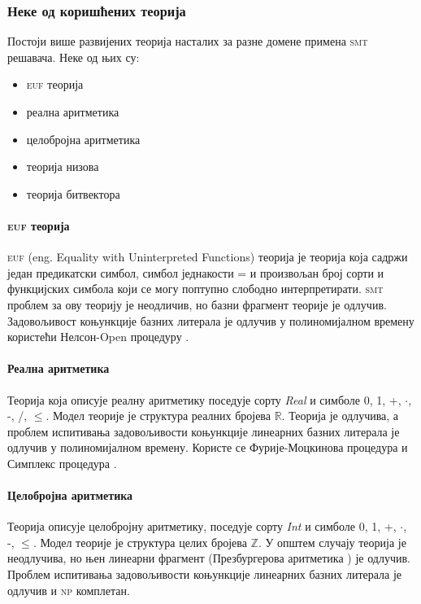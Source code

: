\documentclass[a4paper]{article}
\begin{document}
\subsubsection{Неке од коришћених теорија}
\label{subsubsec:theories}

Постоји више развијених теорија насталих за разне домене примена \textsc{smt} решавача.
Неке од њих су:
\begin{itemize}
    \item \textsc{euf} теорија
    \item реална аритметика
    \item целобројна аритметика
    \item теорија низова
    \item теорија битвектора
\end{itemize}

\paragraph{\textsc{euf} теорија} \textsc{euf} (eng. Equality with Uninterpreted Functions) теорија је теорија која садржи
један предикатски симбол, симбол једнакости = и произвољан број сорти
и функцијских симбола који се могу поптупно слободно интерпретирати.
\textsc{smt} проблем за ову теорију је неодличив, но базни фрагмент теорије је одлучив. Задовољивост коњункције базних литерала
је одлучив у полиномијалном времену користећи Нелсон-Open процедуру \cite{handbookar}.


\paragraph{Реална аритметика} Теорија која описује реалну аритметику поседује сорту \emph{Real} и симболе
0, 1, +, $\cdot$, -, /, $\leq$. Модел теорије је структура реалних бројева $\mathbb{R}$. Теорија је одлучива,
а проблем испитивања задовољивости коњункције линеарних базних литерала је одлучив у полиномијалном времену.
Користе се Фурије-Моцкинова процедура \cite{handbookar} и Симплекс процедура \cite{lp}.

\paragraph{Целобројна аритметика} Теорија описује целобројну аритметику, поседује сорту \emph{Int} и симболе
0, 1, +, $\cdot$, -, $\leq$. Модел теорије је структура целих бројева $\mathbb{Z}$. У општем случају теорија је
неодлучива, но њен линеарни фрагмент (Презбургерова аритметика \cite{handbookar}) је одлучив. Проблем испитивања
задовољивости коњункције линеарних базних литерала је одлучив и \textsc{np} комплетан.
\end{document}

